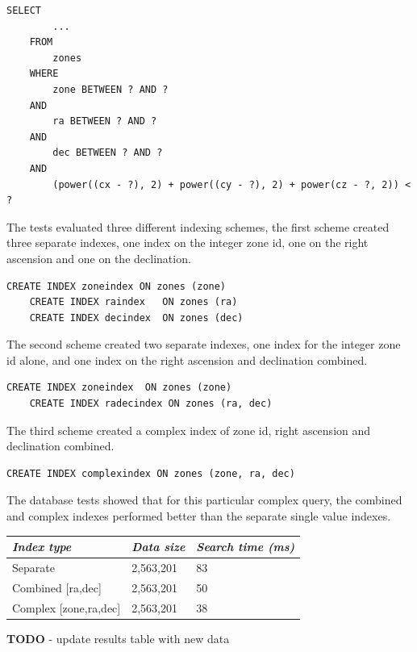 \documentclass{article}
\begin{document}
\begin{lstlisting}[style=SQL]
    SELECT
        ...
    FROM
        zones
    WHERE
        zone BETWEEN ? AND ?
    AND
        ra BETWEEN ? AND ?
    AND
        dec BETWEEN ? AND ?
    AND
        (power((cx - ?), 2) + power((cy - ?), 2) + power(cz - ?, 2)) < ?
\end{lstlisting}

The tests evaluated three different indexing schemes, the first scheme created three separate indexes, one index on the integer zone id, one on the right ascension and one on the declination.

\begin{lstlisting}[style=SQL]
    CREATE INDEX zoneindex ON zones (zone)
    CREATE INDEX raindex   ON zones (ra)
    CREATE INDEX decindex  ON zones (dec)
\end{lstlisting}

The second scheme created two separate indexes, one index for the integer zone id alone, and one index on the right ascension and declination combined.

\begin{lstlisting}[style=SQL]
    CREATE INDEX zoneindex  ON zones (zone)
    CREATE INDEX radecindex ON zones (ra, dec)
\end{lstlisting}

The third scheme created a complex index of zone id, right ascension and declination combined.

\begin{lstlisting}[style=SQL]
    CREATE INDEX complexindex ON zones (zone, ra, dec)
\end{lstlisting}

The database tests showed that for this particular complex query, the combined and complex indexes performed better than the separate single value indexes.

\begin{table}[h]
\centering
\begin{tabular}{|l|l|l|}
\hline
\textit{Index type} & \textit{Data size} & \textit{Search time (ms)} \\ \hline
Separate & 2,563,201 & 83 \\ \hline
Combined [ra,dec] & 2,563,201 & 50 \\ \hline
Complex  [zone,ra,dec] & 2,563,201 & 38 \\ \hline
\end{tabular}
\end{table}

\textbf{TODO} - update results table with new data
\end{document}
